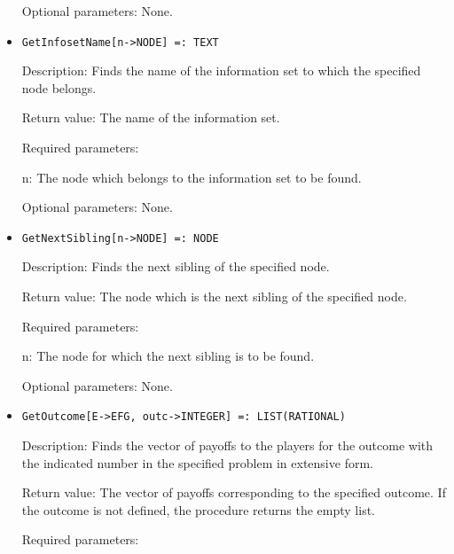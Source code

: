 \begin{itemize}
\item
[Optional parameters:] None.
\ed

\item
\protect \large \begin{verbatim}
GetInfosetName[n->NODE] =: TEXT
\end{verbatim}\normalsize

\bd
\item
[Description:] Finds the name of the information set to which the
specified node belongs.
\item
[Return value:] The name of the information set.
\item
[Required parameters:]\hfil\null

\bd
\item
[n:] The node which belongs to the information set to be found.
\ed

\item
[Optional parameters:] None.
\ed

\item
\protect \large \begin{verbatim}
GetNextSibling[n->NODE] =: NODE
\end{verbatim}\normalsize

\bd
\item
[Description:] Finds the next sibling of the specified node.
\item
[Return value:] The node which is the next sibling of the specified
node.
\item
[Required parameters:]\hfil\null

\bd
\item
[n:] The node for which the next sibling is to be found.
\ed

\item
[Optional parameters:] None.
\ed

\item
\protect \large \begin{verbatim}
GetOutcome[E->EFG, outc->INTEGER] =: LIST(RATIONAL)
\end{verbatim}\normalsize

\bd
\item
[Description:] Finds the vector of payoffs to the players for the
outcome with the indicated number in the specified problem in
extensive form.
\item
[Return value:] The vector of payoffs corresponding to the specified
outcome.  If the outcome is not defined, the procedure returns the
empty list.
\item
[Required parameters:]\hfil\null


\end{itemize}

